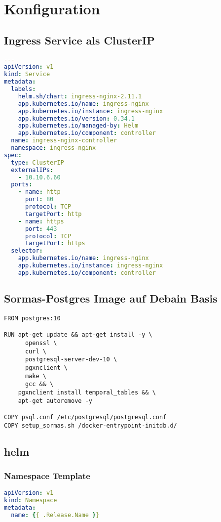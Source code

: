 \chapter{Konfiguration}

\section{Ingress Service als ClusterIP}
\label{app:clusterip}
\begin{lstlisting}[language=yaml, caption={ingress masnifest}]
---
apiVersion: v1
kind: Service
metadata:
  labels:
    helm.sh/chart: ingress-nginx-2.11.1
    app.kubernetes.io/name: ingress-nginx
    app.kubernetes.io/instance: ingress-nginx
    app.kubernetes.io/version: 0.34.1
    app.kubernetes.io/managed-by: Helm
    app.kubernetes.io/component: controller
  name: ingress-nginx-controller
  namespace: ingress-nginx
spec:
  type: ClusterIP
  externalIPs:
    - 10.10.6.60
  ports:
    - name: http
      port: 80
      protocol: TCP
      targetPort: http
    - name: https
      port: 443
      protocol: TCP
      targetPort: https
  selector:
    app.kubernetes.io/name: ingress-nginx
    app.kubernetes.io/instance: ingress-nginx
    app.kubernetes.io/component: controller
\end{lstlisting}



\section{Sormas-Postgres Image auf Debain Basis }
\label{app:small_postgres}
\begin{lstlisting}[caption={Dockerfile für ein kleineres Image auf Debian Basis}]
FROM postgres:10

RUN apt-get update && apt-get install -y \
      openssl \
      curl \
      postgresql-server-dev-10 \
      pgxnclient \
      make \
      gcc && \
    pgxnclient install temporal_tables && \
    apt-get autoremove -y
    
COPY psql.conf /etc/postgresql/postgresql.conf
COPY setup_sormas.sh /docker-entrypoint-initdb.d/
\end{lstlisting}


\section{helm}


\subsection{Namespace Template}
\label{app:namespace_template}
\begin{lstlisting}[language=yaml, caption={namespace manifest}]
apiVersion: v1
kind: Namespace
metadata:
  name: {{ .Release.Name }}
\end{lstlisting}

